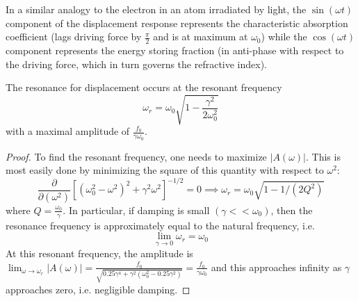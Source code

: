 \documentclass[a4paper]{article}
\begin{document}
\begin{center}
\hspace{0.01cm}
\hspace{0.01cm}
\end{center}
\begin{Note}
In a similar analogy to the electron in an atom irradiated by light, the $\sin(\omega t)$ component of the displacement response represents the characteristic absorption coefficient (lags driving force by $\frac{\pi}{2}$ and is at maximum at $\omega_0$) while the $\cos(\omega t)$ component represents the energy storing fraction (in anti-phase with respect to the driving force, which in turn governs the refractive index). 
\end{Note}
\begin{thm}[Resonance]
The resonance for displacement occurs at the resonant frequency 
$$\omega_r=\omega_0\sqrt{1-\frac{\gamma^2}{2\omega_0^2}}$$ 
with a maximal amplitude of $\frac{f_0}{\gamma\omega_0}$.
\end{thm}
\begin{proof}
To find the resonant frequency, one needs to maximize $|A(\omega)|$. This is most easily done by minimizing the square of this quantity with respect to $\omega^2$:
$$\frac{\partial}{\partial(\omega^2)}[(\omega_0^2-\omega^2)^2+\gamma^2\omega^2]^{-1/2}=0\implies\omega_r=\omega_0\sqrt{1-1/(2Q^2)}$$
where $Q=\frac{\omega_0}{\gamma}$. 
In particular, if damping is small $(\gamma<<\omega_0)$, then the resonance frequency is approximately equal to the natural frequency, i.e. $$\lim_{\gamma\rightarrow0}\omega_r=\omega_0$$
At this resonant frequency, the amplitude is $\lim_{\omega\rightarrow\omega_r}|A(\omega)|=\frac{f_0}{\sqrt{0.25\gamma^4+\gamma^2(\omega_0^2-0.25\gamma^2)}}=\frac{f_0}{\gamma\omega_0}$ and this approaches infinity as $\gamma$ approaches zero, i.e. negligible damping.
\end{proof}
\end{document}

